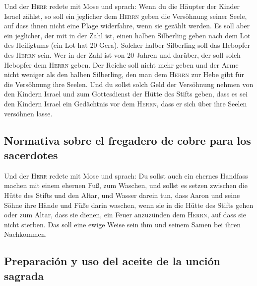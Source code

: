  Und der \textsc{Herr} redete mit Mose und sprach:
 Wenn du die Häupter der Kinder Israel zählst, so soll
ein jeglicher dem \textsc{Herrn} geben die Versöhnung seiner Seele, auf
dass ihnen nicht eine Plage widerfahre, wenn sie gezählt werden.
 Es soll aber ein jeglicher, der mit in der Zahl ist,
einen halben Silberling geben nach dem Lot des Heiligtums (ein Lot hat
20 Gera). Solcher halber Silberling soll das Hebopfer des \textsc{Herrn}
sein.  Wer in der Zahl ist von 20 Jahren und darüber, der
soll solch Hebopfer dem \textsc{Herrn} geben.  Der Reiche
soll nicht mehr geben und der Arme nicht weniger als den halben
Silberling, den man dem \textsc{Herrn} zur Hebe gibt für die Versöhnung
ihre Seelen.  Und du sollst solch Geld der Versöhnung
nehmen von den Kindern Israel und zum Gottesdienst der Hütte des Stifts
geben, dass es sei den Kindern Israel ein Gedächtnis vor dem
\textsc{Herrn}, dass er sich über ihre Seelen versöhnen lasse.

\hypertarget{normativa-sobre-el-fregadero-de-cobre-para-los-sacerdotes}{%
\subsection{Normativa sobre el fregadero de cobre para los
sacerdotes}\label{normativa-sobre-el-fregadero-de-cobre-para-los-sacerdotes}}

 Und der \textsc{Herr} redete mit Mose und sprach:
 Du sollst auch ein ehernes Handfass machen mit einem
ehernen Fuß, zum Waschen, und sollst es setzen zwischen die Hütte des
Stifts und den Altar, und Wasser darein tun,  dass Aaron
und seine Söhne ihre Hände und Füße darin waschen,  wenn
sie in die Hütte des Stifts gehen oder zum Altar, dass sie dienen, ein
Feuer anzuzünden dem \textsc{Herrn},  auf dass sie nicht
sterben. Das soll eine ewige Weise sein ihm und seinem Samen bei ihren
Nachkommen.

\hypertarget{preparaciuxf3n-y-uso-del-aceite-de-la-unciuxf3n-sagrada}{%
\subsection{Preparación y uso del aceite de la unción
sagrada}\label{preparaciuxf3n-y-uso-del-aceite-de-la-unciuxf3n-sagrada}}

